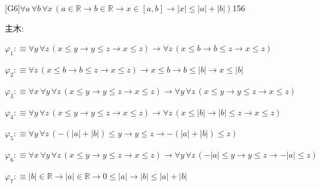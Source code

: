 \begin{fullproof}{[G6]}{$\forall a\,\forall b\,\forall x\,(a \in \mathbb{R} \to b \in \mathbb{R} \to x \in [a,b] \to \lvert x \rvert \leq \lvert a \rvert + \lvert b \rvert)$}{156}
\begin{ptree}
\noLine
{}
\noLine
{}
\end{ptree}
\noindent 主木:
\begin{ptree}
\noLine
{}
\noLine
{}
\noLine
{}
\noLine
{}
\end{ptree}
\begin{abbrevlist}
\item $\varphi_{1} :\equiv \forall y\,\forall z\,(x \leq y \to y \leq z \to x \leq z) \to \forall z\,(x \leq b \to b \leq z \to x \leq z)$
\item $\varphi_{2} :\equiv \forall z\,(x \leq b \to b \leq z \to x \leq z) \to x \leq b \to b \leq \lvert b \rvert \to x \leq \lvert b \rvert$
\item $\varphi_{3} :\equiv \forall x\,\forall y\,\forall z\,(x \leq y \to y \leq z \to x \leq z) \to \forall y\,\forall z\,(x \leq y \to y \leq z \to x \leq z)$
\item $\varphi_{4} :\equiv \forall y\,\forall z\,(x \leq y \to y \leq z \to x \leq z) \to \forall z\,(x \leq \lvert b \rvert \to \lvert b \rvert \leq z \to x \leq z)$
\item $\varphi_{5} :\equiv \forall y\,\forall z\,(-(\lvert a \rvert + \lvert b \rvert) \leq y \to y \leq z \to -(\lvert a \rvert + \lvert b \rvert) \leq z)$
\item $\varphi_{6} :\equiv \forall x\,\forall y\,\forall z\,(x \leq y \to y \leq z \to x \leq z) \to \forall y\,\forall z\,(-\lvert a \rvert \leq y \to y \leq z \to -\lvert a \rvert \leq z)$
\item $\varphi_{7} :\equiv \lvert b \rvert \in \mathbb{R} \to \lvert a \rvert \in \mathbb{R} \to 0 \leq \lvert a \rvert \to \lvert b \rvert \leq \lvert a \rvert + \lvert b \rvert$

\end{abbrevlist}
\end{fullproof}

